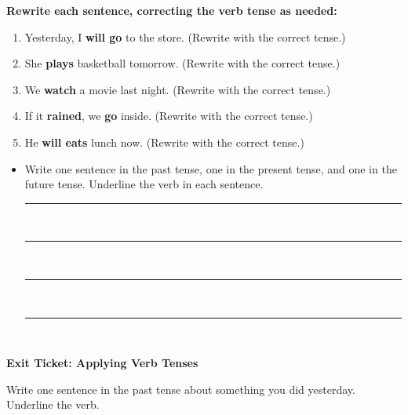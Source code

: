 \documentclass[12pt]{article}
\begin{document}
\begin{tcolorbox}[colframe=black!60, colback=white, 
coltitle=black, colbacktitle=black!15, fonttitle=\bfseries\Large, 
title=Independent Practice, halign title=center, left=10pt, right=10pt, top=10pt, bottom=15pt]
\textbf{Rewrite each sentence, correcting the verb tense as needed:}
\begin{enumerate}[itemsep=3em]
    \item Yesterday, I \textbf{will go} to the store. (Rewrite with the correct tense.)
    \item She \textbf{plays} basketball tomorrow. (Rewrite with the correct tense.)
    \item We \textbf{watch} a movie last night. (Rewrite with the correct tense.)
    \item If it \textbf{rained}, we \textbf{go} inside. (Rewrite with the correct tense.)
    \item He \textbf{will eats} lunch now. (Rewrite with the correct tense.)
\end{enumerate}
\end{tcolorbox}

\vspace{1em}

\begin{tcolorbox}[colframe=black!60, colback=white, 
coltitle=black, colbacktitle=black!15, fonttitle=\bfseries\Large, 
title=Exit Ticket, halign title=center, left=10pt, right=10pt, top=10pt, bottom=15pt]

\begin{itemize}
\item Write one sentence in the past tense, one in the present tense, and one in the future tense. Underline the verb in each sentence.

\rule{15cm}{0.4pt} \\[0.5cm]
\rule{15cm}{0.4pt} \\[0.5cm]
\rule{15cm}{0.4pt} \\[0.5cm]
\rule{15cm}{0.4pt} \\[0.5cm]

\end{itemize}
\end{tcolorbox}

\begin{tcolorbox}[colframe=black!60, colback=white, 
coltitle=black, colbacktitle=black!15, fonttitle=\bfseries\Large, 
title=Exit Ticket Activity, halign title=center, left=10pt, right=10pt, top=10pt, bottom=15pt]
\textbf{Exit Ticket: Applying Verb Tenses}

Write one sentence in the past tense about something you did yesterday. Underline the verb.
 
\vspace{4cm}
\end{tcolorbox}
\end{document}

